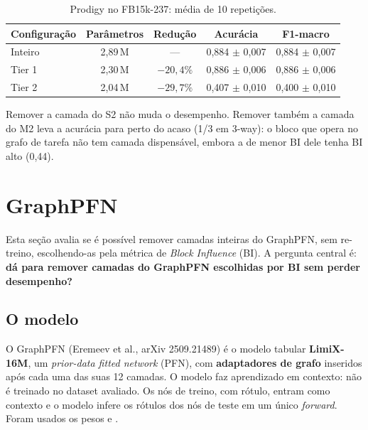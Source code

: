 \documentclass[12pt,a4paper]{article}
\newcommand{\ruim}[1]{\textcolor{red!70!black}{#1}}
\begin{document}
\begin{table}[H]
\centering
\caption{Prodigy no FB15k-237: média de 10 repetições.}
\label{tab:prodigy}
\begin{tabular}{@{}lcccc@{}}
\toprule
Configuração & Parâmetros & Redução & Acurácia & F1-macro \\
\midrule
Inteiro & 2,89\,M & ---          & 0,884 $\pm$ 0,007 & 0,884 $\pm$ 0,007 \\
Tier 1  & 2,30\,M & $-20{,}4\%$  & 0,886 $\pm$ 0,006 & 0,886 $\pm$ 0,006 \\
Tier 2  & 2,04\,M & $-29{,}7\%$  & \ruim{0,407 $\pm$ 0,010} & \ruim{0,400 $\pm$ 0,010} \\
\bottomrule
\end{tabular}
\end{table}

Remover a camada do S2 não muda o desempenho. Remover também a camada do M2 leva a acurácia para perto do acaso (1/3 em 3-way): o bloco que opera no grafo de tarefa não tem camada dispensável, embora a de menor BI dele tenha BI alto (0,44).

\section{GraphPFN}

Esta seção avalia se é possível remover camadas inteiras do GraphPFN, sem re-treino, escolhendo-as pela métrica de \emph{Block Influence} (BI). A pergunta central é: \textbf{dá para remover camadas do GraphPFN escolhidas por BI sem perder desempenho?}

\subsection{O modelo}

O GraphPFN (Eremeev et al., arXiv 2509.21489) é o modelo tabular \textbf{LimiX-16M}, um \emph{prior-data fitted network} (PFN), com \textbf{adaptadores de grafo} inseridos após cada uma das suas 12 camadas. O modelo faz aprendizado em contexto: não é treinado no dataset avaliado. Os nós de treino, com rótulo, entram como contexto e o modelo infere os rótulos dos nós de teste em um único \emph{forward}. Foram usados os pesos  e .
\end{document}

